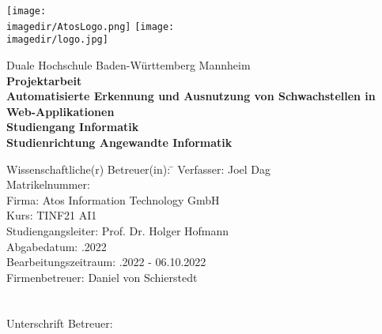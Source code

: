 \begin{titlepage}
	\begin{minipage}{\textwidth}
		\vspace{-2cm}
		\noindent \texttt{[image: \\imagedir/AtosLogo.png]} \hfill 
		\texttt{[image: \\imagedir/logo.jpg]}
	\end{minipage}
	\vspace{1em}
	\begin{center}
		{\textsf{\large Duale Hochschule Baden-W\"urttemberg Mannheim}}\\[4em]
		{\textsf{\textbf{\large{Projektarbeit}}}}\\[6mm]
		{\textsf{\textbf{\Large{}Automatisierte Erkennung und Ausnutzung von Schwachstellen in Web-Applikationen
		}}} \\[1.5cm]
		{\textsf{\textbf{\large{}Studiengang Informatik}}\\[6mm]
			\textsf{\textbf{Studienrichtung Angewandte Informatik}}}\vspace{10em}
		
		\begin{minipage}{\textwidth}
			\begin{tabbing}
				Wissenschaftliche(r) Betreuer(in): \hspace{0.85cm}\=\kill
				Verfasser: \> Joel Dag \\[1.5mm]
				Matrikelnummer:  \\[1.5mm]
				Firma: \> Atos Information Technology GmbH  \\[1.5mm]
				Kurs: \> TINF21 AI1  \\[1.5mm]
				Studiengangsleiter: \> Prof. Dr. Holger Hofmann \\[1.5mm]
				Abgabedatum: .2022\\[1.5mm]
				Bearbeitungszeitraum: .2022 - 06.10.2022\\[1.5mm]
				Firmenbetreuer: \> Daniel von Schierstedt \\[1.5mm] \\ \\
				Unterschrift Betreuer: \> \underline {\hspace{4cm}}\\[1.5mm] 
			\end{tabbing}
		\end{minipage}
	\end{center}
\end{titlepage}